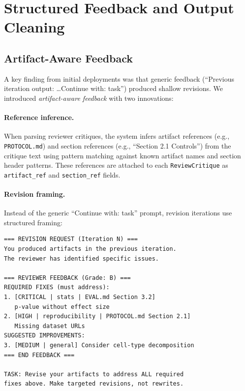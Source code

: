 \documentclass[10pt]{article}
\begin{document}

\section{Structured Feedback and Output Cleaning}
\label{sec:feedback}

\subsection{Artifact-Aware Feedback}

A key finding from initial deployments was that generic feedback (``Previous iteration output: \ldots Continue with: task'') produced shallow revisions. We introduced \emph{artifact-aware feedback} with two innovations:

\paragraph{Reference inference.}
When parsing reviewer critiques, the system infers artifact references (e.g., \texttt{PROTOCOL.md}) and section references (e.g., ``Section 2.1 Controls'') from the critique text using pattern matching against known artifact names and section header patterns. These references are attached to each \texttt{ReviewCritique} as \texttt{artifact\_ref} and \texttt{section\_ref} fields.

\paragraph{Revision framing.}
Instead of the generic ``Continue with: task'' prompt, revision iterations use structured framing:

\begin{lstlisting}[caption={Revision prompt template injected for post-review iterations.}]
=== REVISION REQUEST (Iteration N) ===
You produced artifacts in the previous iteration.
The reviewer has identified specific issues.

=== REVIEWER FEEDBACK (Grade: B) ===
REQUIRED FIXES (must address):
1. [CRITICAL | stats | EVAL.md Section 3.2]
   p-value without effect size
2. [HIGH | reproducibility | PROTOCOL.md Section 2.1]
   Missing dataset URLs
SUGGESTED IMPROVEMENTS:
3. [MEDIUM | general] Consider cell-type decomposition
=== END FEEDBACK ===

TASK: Revise your artifacts to address ALL required
fixes above. Make targeted revisions, not rewrites.
\end{lstlisting}
\end{document}
